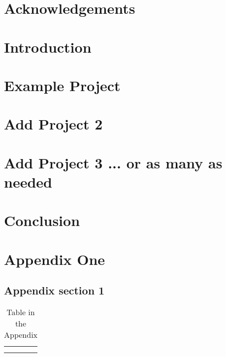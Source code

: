 \documentclass[11pt]{book}
\begin{document}

\doublespacing



\chapter*{Acknowledgements}



\tableofcontents{}
\listoffigures
\listoftables
\clearpage

\chapter {Introduction}


\chapter{Example Project} %
\label{chapter:two}


\chapter{Add Project 2} %
\label{chapter:three}

\chapter{Add Project 3 ... or as many as needed} %
\label{chapter:four}


\chapter{Conclusion}


\balance



\newpage
\newcommand{\beginsupplement}{%
    \setcounter{chapter}{0}
    \renewcommand{\thechapter}{\Alph{chapter}}%
 }

\beginsupplement
\chapter{Appendix One}
\section{Appendix section 1}
\begin{table}[]
    \centering
    \begin{tabular}{c|c}
         &  \\
         & 
    \end{tabular}
    \caption{Table in the Appendix}
    \label{tab:my_label}
\end{table}
\end{document}

